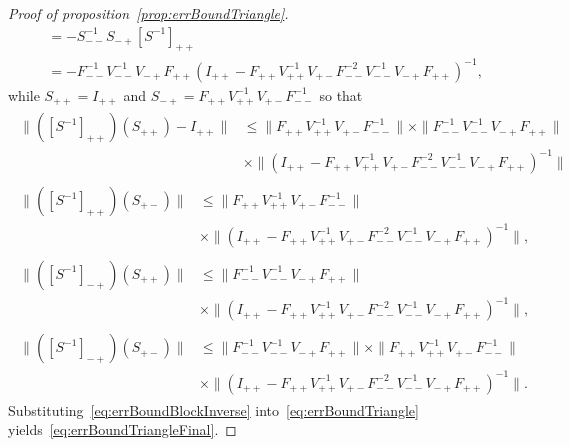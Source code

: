 \begin{proof}[Proof of proposition~\ref{prop:errBoundTriangle}]
\begin{align*}
        &=-S_{--}^{-1}S_{-+}[S^{-1}]_{++}\\
        &=-F_{--}^{-1}V_{--}^{-1}V_{-+}F_{++}(I_{++}-F_{++}V_{++}^{-1}V_{+-}F_{--}^{-2}V_{--}^{-1}V_{-+}F_{++})^{-1},
    \end{align*}
    while $S_{++}=I_{++}$ and $S_{-+}=F_{++}V_{++}^{-1}V_{+-}F_{--}^{-1}$ so that
    \begin{subequations}
    \begin{align}
    \begin{split}
        \|([S^{-1}]_{++})(S_{++})- I_{++}\|
        &\leq
        \|F_{++}V_{++}^{-1}V_{+-}F_{--}^{-1}\|\times
        \|F_{--}^{-1}V_{--}^{-1}V_{-+}F_{++}\|\\
        &\times
        \|(I_{++}-F_{++}V_{++}^{-1}V_{+-}F_{--}^{-2}V_{--}^{-1}V_{-+}F_{++})^{-1}\|
    \end{split}\\
    \begin{split}
        \|([S^{-1}]_{++})(S_{+-})\|
        &\leq
        \|F_{++}V_{++}^{-1}V_{+-}F_{--}^{-1}\|\\
        &\times
        \|(I_{++}-F_{++}V_{++}^{-1}V_{+-}F_{--}^{-2}V_{--}^{-1}V_{-+}F_{++})^{-1}\|,
    \end{split}\\
    \begin{split}
        \|([S^{-1}]_{-+})(S_{++})\|
        &\leq\|F_{--}^{-1}V_{--}^{-1}V_{-+}F_{++}\|\\
        &\times\|(I_{++}-F_{++}V_{++}^{-1}V_{+-}F_{--}^{-2}V_{--}^{-1}V_{-+}F_{++})^{-1}\|,
    \end{split}\\
    \begin{split}
        \|([S^{-1}]_{-+})(S_{+-})\|
        &\leq\|F_{--}^{-1}V_{--}^{-1}V_{-+}F_{++}\|
        \times\|F_{++}V_{++}^{-1}V_{+-}F_{--}^{-1}\|\\
        &\times\|(I_{++}-F_{++}V_{++}^{-1}V_{+-}F_{--}^{-2}V_{--}^{-1}V_{-+}F_{++})^{-1}\|.
    \end{split}
    \end{align}
    \label{eq:errBoundBlockInverse}
    \end{subequations}
    Substituting~\eqref{eq:errBoundBlockInverse} into~\eqref{eq:errBoundTriangle} yields~\eqref{eq:errBoundTriangleFinal}.
\end{proof}

